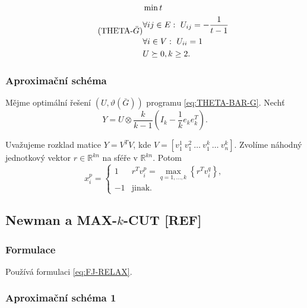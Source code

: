 \begin{equation}\tag{THETA-$\bar{G}$}
    \begin{split}
        &\min t \\
        &\forall ij \in E:\ U_{ij} = -\frac{1}{t - 1} \\
        &\forall i \in V:\ U_{ii} = 1 \\
        &U \succeq 0, k \geq 2.
    \end{split}
    \label{eq:THETA-BAR-G}
\end{equation}

\subsubsection*{Aproximační schéma}

Mějme optimální řešení $(U, \vartheta(\bar{G}))$ programu \ref{eq:THETA-BAR-G}. Nechť
\begin{equation}
    Y = U \otimes \frac{k}{k - 1} \left( I_k - \frac{1}{k} e_k e_k^T \right).
\end{equation}

Uvažujeme rozklad matice $Y = V^T V$, kde $V = \left[ v_1^1\ v_1^2\ \dots\ v_1^k\ \dots\ v_n^k \right]$. Zvolíme náhodný jednotkový vektor $r \in \mathbb{R}^{kn}$ na sféře v $\mathbb{R}^{kn}$. Potom
$$
    x_i^p = 
    \begin{cases}
        1  & r^T v_i^p = \max_{q = 1, \dots, k} \left\{ r^T v_i^q \right\}, \\
        -1 & \text{jinak.}
    \end{cases}
$$


\subsection{Newman a MAX-$k$-CUT \textbf{[REF]}}

\subsubsection*{Formulace}

Používá formulaci \ref{eq:FJ-RELAX}.

\subsubsection*{Aproximační schéma 1}


